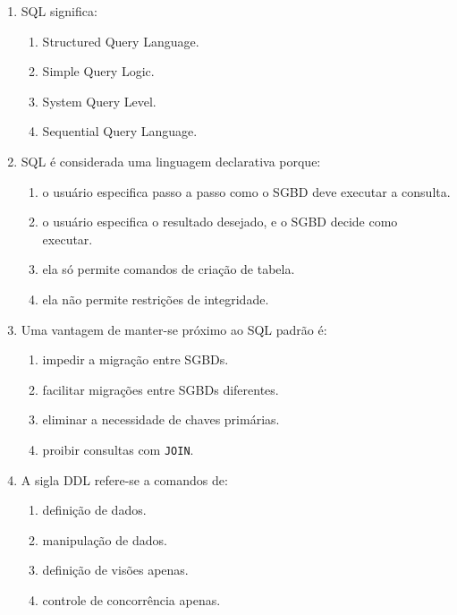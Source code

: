 \documentclass[12pt,a4paper]{article}
\begin{document}
\begin{enumerate}[label=\textbf{Q\arabic*.}]

\item SQL significa:

\begin{enumerate}[label=\alph*)]
    \item Structured Query Language.
    \item Simple Query Logic.
    \item System Query Level.
    \item Sequential Query Language.
\end{enumerate}

\item SQL é considerada uma linguagem declarativa porque:

\begin{enumerate}[label=\alph*)]
    \item o usuário especifica passo a passo como o SGBD deve executar a consulta.
    \item o usuário especifica o resultado desejado, e o SGBD decide como executar.
    \item ela só permite comandos de criação de tabela.
    \item ela não permite restrições de integridade.
\end{enumerate}

\item Uma vantagem de manter-se próximo ao SQL padrão é:

\begin{enumerate}[label=\alph*)]
    \item impedir a migração entre SGBDs.
    \item facilitar migrações entre SGBDs diferentes.
    \item eliminar a necessidade de chaves primárias.
    \item proibir consultas com \texttt{JOIN}.
\end{enumerate}

\item A sigla DDL refere-se a comandos de:

\begin{enumerate}[label=\alph*)]
    \item definição de dados.
    \item manipulação de dados.
    \item definição de visões apenas.
    \item controle de concorrência apenas.
\end{enumerate}


\end{enumerate}
\end{document}
